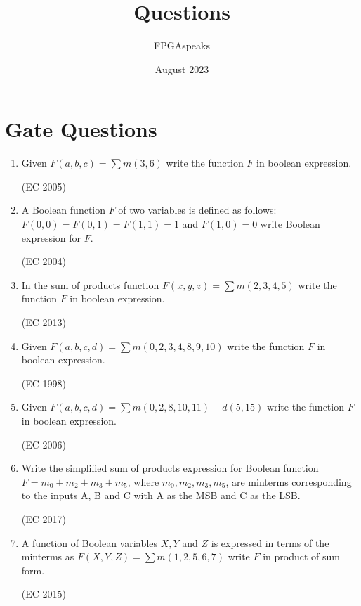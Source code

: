\documentclass{article}
\title{\textbf{Questions}}
\author{FPGAspeaks}
\date{August 2023}
\begin{document}
\maketitle

\section{Gate Questions}
\begin{enumerate}
    \item Given $F(a,b,c)=\sum m(3,6)$ write the function $F$ in boolean expression.
          \begin{flushright}
      (EC 2005)
    \end{flushright}
    \item A Boolean function $F$ of two variables is defined as follows: $F(0,0)=F(0,1)=F(1,1)=1$ and $F(1,0)=0$ write Boolean expression for $F$.\begin{flushright}
      (EC 2004)
    \end{flushright}
    \item In the sum of products function $F(x,y,z)=\sum m(2,3,4,5)$ write the function $F$ in boolean expression.
      \begin{flushright}
      (EC 2013)
    \end{flushright}
      \item Given $F(a,b,c,d)=\sum m(0,2,3,4,8,9,10)$ write the function $F$ in boolean expression.
          \begin{flushright}
      (EC 1998)
    \end{flushright}
    \item Given $F(a,b,c,d)=\sum m(0,2,8,10,11)+d(5,15)$ write the function $F$ in boolean expression.
          \begin{flushright}
      (EC 2006)
    \end{flushright}
    \item Write the simplified sum of products expression for Boolean function $F = m_0+m_2+m_3+m_5$, where $m_0, m_2, m_3, m_5$, are minterms corresponding to the inputs A, B and C with A as the MSB and C as the LSB.
     \begin{flushright}
      (EC 2017)
    \end{flushright}
    \item A function of Boolean variables $X, Y$ and $Z$ is expressed in terms of the minterms as $F(X,Y,Z)=\sum m(1,2,5,6,7)$ write $F$ in product of sum form.
    \begin{flushright}
      (EC 2015)
    \end{flushright}

\end{enumerate}
\end{document}
